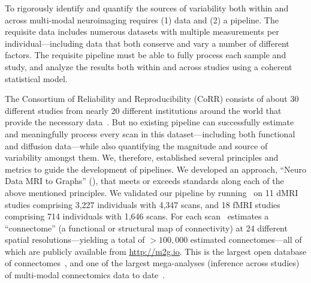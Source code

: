 \documentclass[11pt]{article}
\begin{document}
\begin{multicols}{2}
To rigorously identify and quantify the sources of variability both within and across  multi-modal neuroimaging  requires (1) data and (2) a pipeline. The requisite data includes  numerous datasets with multiple measurements per individual---including data that both conserve and vary a number of different factors. The requisite pipeline must be able to fully  process each sample and study, and analyze the results both within and across studies using a coherent statistical model.  


The Consortium of Reliability and Reproducibility (CoRR) consists of about 30 different studies from nearly 20 different institutions around the world that provide the necessary data~\cite{corr}. But no existing pipeline can successfully estimate and meaningfully process every scan in this dataset---including both functional and diffusion data---while also quantifying the magnitude and source of variability amongst them. 
We, therefore, established several principles and metrics to guide the development of pipelines.  
We developed an approach, ``Neuro Data MRI to Graphs'' (\ndmg), that 
meets or exceeds standards along each of the above mentioned principles. We validated our pipeline by running \ndmg~on 11 dMRI  studies comprising 3,227 individuals with 4,347 scans, 
and 18 fMRI  studies comprising 714 individuals with 1,646 scans. 
For each scan \ndmg~estimates  a ``connectome'' (a functional or structural map of connectivity) at 24 different spatial resolutions---yielding a total of  $>100,000$ estimated connectomes---all of which are publicly available from \url{http://m2g.io}. This is the largest open database of connectomes~\cite{brown2016connected},
and one of the largest mega-analyses (inference across studies) of multi-modal connectomics data to date~\cite{varoquaux2013learning, vidaurre2017discovering}. 




\end{multicols}
\end{document}
